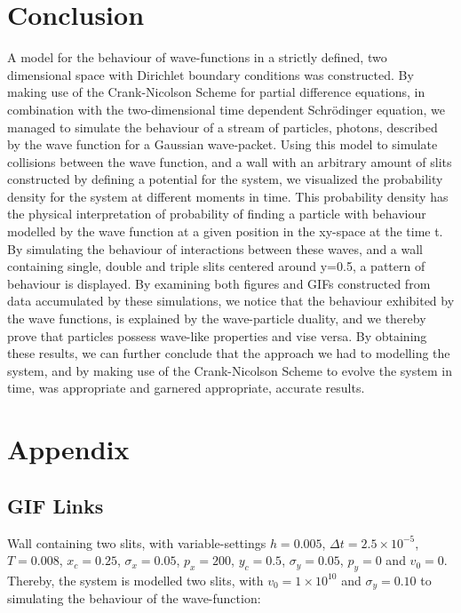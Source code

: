 \documentclass[10pt, nofootinbib, twocolumn]{revtex4-1}
\begin{document}
\section{Conclusion}\label{sec:conclusion}
A model for the behaviour of wave-functions in a strictly defined, two dimensional space with Dirichlet boundary conditions was constructed. By making use of the Crank-Nicolson Scheme for partial difference equations, in combination with the two-dimensional time dependent Schrödinger equation, we managed to simulate the behaviour of a stream of particles, photons, described by the wave function for a Gaussian wave-packet. Using this model to simulate collisions between the wave function, and a wall with an arbitrary amount of slits constructed by defining a potential for the system, we visualized the probability density for the system at different moments in time. This probability density has the physical interpretation of probability of finding a particle with behaviour modelled by the wave function at a given position in the xy-space at the time t. \\

By simulating the behaviour of interactions between these waves, and a wall containing single, double and triple slits centered around y=0.5, a pattern of behaviour is displayed. By examining both figures and GIFs constructed from data accumulated by these simulations, we notice that the behaviour exhibited by the wave functions, is explained by the wave-particle duality, and we thereby prove that particles possess wave-like properties and vise versa. By obtaining these results, we can further conclude that the approach we had to modelling the system, and by making use of the Crank-Nicolson Scheme to evolve the system in time, was appropriate and garnered appropriate, accurate results. 




{}

\cleardoublepage
\section{Appendix}\label{sec:appendix}
\subsection{GIF Links}\label{sec:links}
Wall containing two slits, with variable-settings $h = 0.005$, $\Delta t = 2.5\times10^{-5}$, $T = 0.008$, $x_c = 0.25$, $\sigma_x = 0.05$, $p_x = 200$, $y_c = 0.5$, $\sigma_y = 0.05$, $p_y = 0$ and $v_0 = 0$. Thereby, the system is modelled two slits, with $v_0 = 1\times10^{10}$ and $\sigma_y = 0.10$ to simulating the behaviour of the wave-function: \\
\end{document}
